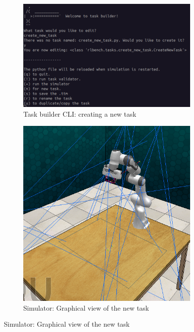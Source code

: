 \begin{figure}[htbp]
  \begin{subfigure}{0.48\linewidth}
    \centering
    \includegraphics[width=0.8\linewidth]{assets/early-work/task-builder-cli-1.png}      \caption{Task builder CLI: creating a new task}
  \end{subfigure}%
  \hfill
  \begin{subfigure}{0.48\textwidth}
    \centering
    \includegraphics[width=0.8\linewidth]{assets/early-work/task-builder-scene.png}
    \caption{Simulator: Graphical view of the new task}
  \end{subfigure}%
  
  \vspace{0.5cm}
  

\end{figure}
